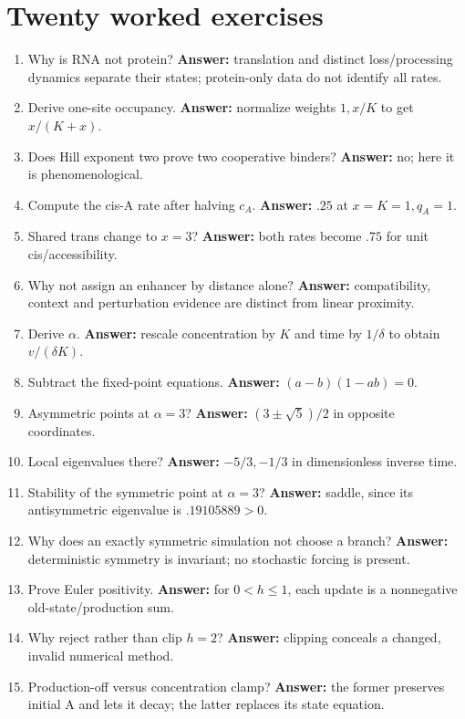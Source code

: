 \section{Twenty worked exercises}
\begin{enumerate}
\item Why is RNA not protein? \textbf{Answer:} translation and distinct loss/processing
dynamics separate their states; protein-only data do not identify all rates.
\item Derive one-site occupancy. \textbf{Answer:} normalize weights $1,x/K$ to get $x/(K+x)$.
\item Does Hill exponent two prove two cooperative binders? \textbf{Answer:} no; here it is phenomenological.
\item Compute the cis-A rate after halving $c_A$. \textbf{Answer:} $.25$ at $x=K=1,q_A=1$.
\item Shared trans change to $x=3$? \textbf{Answer:} both rates become $.75$ for unit cis/accessibility.
\item Why not assign an enhancer by distance alone? \textbf{Answer:} compatibility, context and perturbation evidence are distinct from linear proximity.
\item Derive $\alpha$. \textbf{Answer:} rescale concentration by $K$ and time by $1/\delta$ to obtain $v/(\delta K)$.
\item Subtract the fixed-point equations. \textbf{Answer:} $(a-b)(1-ab)=0$.
\item Asymmetric points at $\alpha=3$? \textbf{Answer:} $(3\pm\sqrt5)/2$ in opposite coordinates.
\item Local eigenvalues there? \textbf{Answer:} $-5/3,-1/3$ in dimensionless inverse time.
\item Stability of the symmetric point at $\alpha=3$? \textbf{Answer:} saddle, since its antisymmetric eigenvalue is $.19105889>0$.
\item Why does an exactly symmetric simulation not choose a branch? \textbf{Answer:} deterministic symmetry is invariant; no stochastic forcing is present.
\item Prove Euler positivity. \textbf{Answer:} for $0<h\le1$, each update is a nonnegative old-state/production sum.
\item Why reject rather than clip $h=2$? \textbf{Answer:} clipping conceals a changed, invalid numerical method.
\item Production-off versus concentration clamp? \textbf{Answer:} the former preserves initial A and lets it decay; the latter replaces its state equation.

\end{enumerate}
